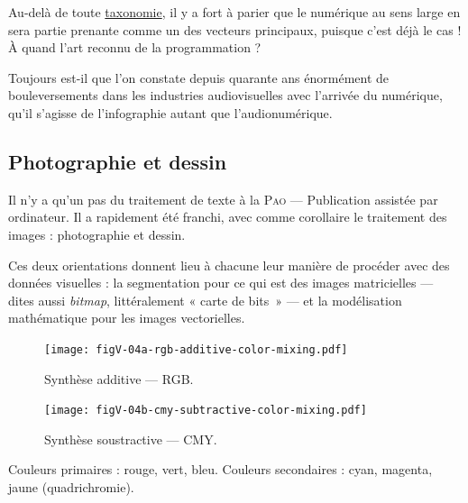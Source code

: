 Au-delà de toute \href{https://fr.wikipedia.org/wiki/Classification_des_arts}{taxonomie}, il y a fort à parier que le numérique au sens large en sera partie prenante comme un des vecteurs principaux, puisque c'est déjà le cas ! À quand l'art reconnu de la programmation ?

Toujours est-il que l'on constate depuis quarante ans énormément de bouleversements dans les industries audiovisuelles avec l'arrivée du numérique, qu'il s'agisse de l'infographie autant que l'audionumérique.


\subsection[Photographie et dessin]{Photographie et dessin}
\label{sub:V.2.1}

Il n'y a qu'un pas du traitement de texte à la \textsc{Pao} --- Publication assistée par ordinateur. Il a rapidement été franchi, avec comme corollaire le traitement des images : photographie et dessin. 

Ces deux orientations donnent lieu à chacune leur manière de procéder avec des données visuelles : la segmentation pour ce qui est des images matricielles --- dites aussi \textit{bitmap}, littéralement « carte de bits~» --- et la modélisation mathématique pour les images vectorielles.

\begin{marginfigure}%
\begin{subfigure}{\linewidth}
\texttt{[image: figV-04a-rgb-additive-color-mixing.pdf]}
\caption{\label{fig:V.4a}Synthèse additive --- RGB.}
\end{subfigure}
\begin{subfigure}{\linewidth}
\vspace{4pt}
\texttt{[image: figV-04b-cmy-subtractive-color-mixing.pdf]}
\caption{\label{fig:V.4b}Synthèse soustractive --- CMY.}
\end{subfigure}
\vspace{-2pt}
\caption{\label{fig:V.4}Couleurs primaires : rouge, vert, bleu. Couleurs secondaires : cyan, magenta, jaune (quadrichromie).}
\end{marginfigure}

